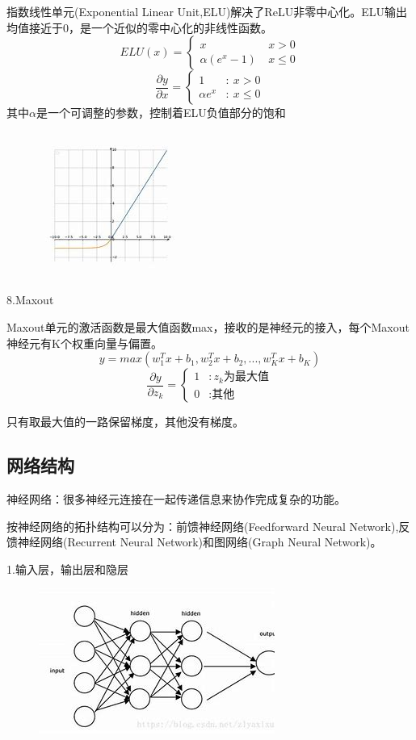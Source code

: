 \documentclass[openbib]{article}
\begin{document}
指数线性单元(Exponential Linear Unit,ELU)解决了ReLU非零中心化。ELU输出均值接近于0，是一个近似的零中心化的非线性函数。
$$ELU(x)=\left\{ \begin{array}{cl}
	x &  \ x > 0 \\
	\alpha(e^x-1) &  \ x \le  0
\end{array} \right.$$
$$\frac{\partial y}{\partial x}=\left\{ \begin{array}{cl}
	1 & : \ x > 0 \\
	\alpha e^x & : \ x \le  0
\end{array} \right.$$
其中$\alpha$是一个可调整的参数，控制着ELU负值部分的饱和
\begin{figure}[htbp]
	\centering
	\includegraphics[scale=0.6]{ELU}
\end{figure}
\begin{center}
	8.Maxout
\end{center}
Maxout单元的激活函数是最大值函数max，接收的是神经元的接入，每个Maxout神经元有K个权重向量与偏置。
$$y=max(w_1^Tx+b_1,w_2^Tx+b_2,...,w_K^Tx+b_K)$$
$$\frac{\partial y}{\partial z_k}=\left\{ \begin{array}{cl}
	1 & : \text{$z_k$为最大值} \\
	0 & : \text{其他}
\end{array} \right.$$

只有取最大值的一路保留梯度，其他没有梯度。
\subsection{网络结构}
神经网络：很多神经元连接在一起传递信息来协作完成复杂的功能。

按神经网络的拓扑结构可以分为：前馈神经网络(Feedforward Neural Network),反馈神经网络(Recurrent Neural Network)和图网络(Graph Neural Network)。

\begin{center}
	1.输入层，输出层和隐层
\end{center}
\begin{figure}[htbp]
	\centering
	\includegraphics[scale=0.7]{前馈神经网络}
\end{figure}
\end{document}
